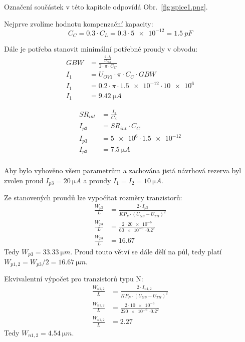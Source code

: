Označení součástek v této kapitole odpovídá Obr.~\ref{fig:spice1.png}.

Nejprve zvolíme hodnotu kompenzační kapacity:
\[
    C_{C} = \num{0.3}\cdot C_{L} = \num{0.3}\cdot  \num{5e-12} = \qty{1.5}{pF}
\] 

Dále je potřeba stanovit minimální potřebné proudy v obvodu:
\begin{align*}
    GBW &= \frac{\frac{2\cdot I_{1} }{U_{OV1} }}{2\cdot \pi \cdot C_{C} } \\ 
    I_{1} &= U_{OV1}\cdot \pi \cdot C_{C} \cdot GBW \\ 
    I_{1} &= \num{0.2}\cdot \pi \cdot \num{1.5e-12} \cdot \num{10e6} \\ 
    I_{1} &= \qty{9.42}{\micro A}
\end{align*}

\begin{align*}
    SR_{int}  &= \frac{I_{5}}{C_{C} } \\ 
    I_{p3} &= SR_{int}\cdot C_{C}  \\
    I_{p3} &= \num{5e6}\cdot \num{1.5e-12}  \\
    I_{p3} &= \qty{7.5}{\micro A}  \\
\end{align*}

    Aby bylo vyhověno všem parametrům a zachována jistá návrhová rezerva byl zvolen proud \(I_{p3} =\qty{20}{\micro A}\) a proudy \(I_{1}=I_{2}= \qty{10}{\micro A}  \).

    Ze stanovených proudů lze vypočítat rozměry tranzistorů:
    \begin{align*}
        \frac{W_{p3}}{L} &= \frac{2\cdot I_{p3}}{KP_{P}\cdot (U_{GS} -U_{TH})^2 } \\
        \frac{W_{p3}}{L} &= \frac{2\cdot \num{20e-6}}{\num{60e-6}\cdot \num{0.2}^2 } \\
        \frac{W_{p3}}{L} &= \num{16.67}
    \end{align*}
    Tedy \(W_{p3} = \qty{33.33}{\micro m}\). Proud touto větví se dále dělí na půl, tedy platí \(W_{p1,2} = W_{p3} /2 = \qty{16.67}{\micro m}\). 

    Ekvivalentní výpočet pro tranzistorů typu N:
    \begin{align*}
        \frac{W_{n1,2}}{L} &= \frac{2\cdot I_{n1,2}}{KP_{N}\cdot (U_{GS} -U_{TH})^2 } \\
        \frac{W_{n1,2}}{L} &= \frac{2\cdot \num{10e-6}}{\num{220e-6}\cdot \num{0.2}^2 } \\
        \frac{W_{n1,2}}{L} &= \num{2.27}
    \end{align*}
    Tedy \(W_{n1,2} = \qty{4.54}{\micro m}\).


